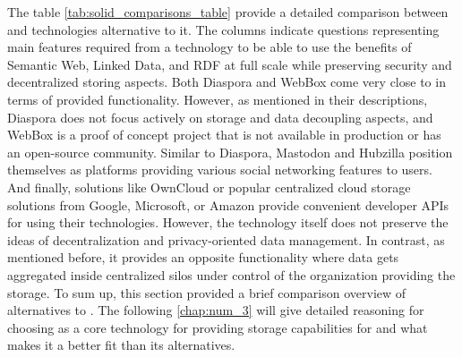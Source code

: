 The table \ref{tab:solid_comparisons_table} provide a detailed comparison between \solid{} and technologies alternative to it. The columns indicate questions representing main features required from a technology to be able to use the benefits of Semantic Web, Linked Data, and RDF at full scale while preserving security and decentralized storing aspects. Both Diaspora and WebBox come very close to \solid{} in terms of provided functionality. However, as mentioned in their descriptions, Diaspora does not focus actively on storage and data decoupling aspects, and WebBox is a proof of concept project that is not available in production or has an open-source community. Similar to Diaspora, Mastodon and Hubzilla position themselves as platforms providing various social networking features to users. And finally, solutions like OwnCloud or popular centralized cloud storage solutions from Google, Microsoft, or Amazon provide convenient developer APIs for using their technologies. However, the technology itself does not preserve the ideas of decentralization and privacy-oriented data management. In contrast, as mentioned before, it provides an opposite functionality where data gets aggregated inside centralized silos under control of the organization providing the storage. 
To sum up, this section provided a brief comparison overview of alternatives to \solid{}. The following \autoref{chap:num_3} will give detailed reasoning for choosing \solid{} as a core technology for providing storage capabilities for \lpa{} and what makes it a better fit than its alternatives. 

